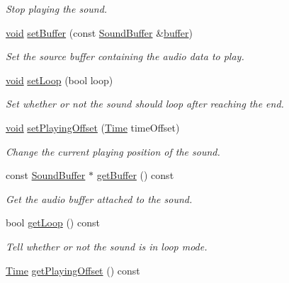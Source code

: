 \begin{DoxyCompactItemize}
\begin{DoxyCompactList}\small\item\em Stop playing the sound. \end{DoxyCompactList}\item 
\hyperlink{glutf90_8h_ac778d6f63f1aaf8ebda0ce6ac821b56e}{void} \hyperlink{classsf_1_1_sound_a8b395e9713d0efa48a18628c8ec1972e}{set\-Buffer} (const \hyperlink{classsf_1_1_sound_buffer}{Sound\-Buffer} \&\hyperlink{gl3_8h_a7fc54503e1a1cf98d128b839ebc0b4d0}{buffer})
\begin{DoxyCompactList}\small\item\em Set the source buffer containing the audio data to play. \end{DoxyCompactList}\item 
\hyperlink{glutf90_8h_ac778d6f63f1aaf8ebda0ce6ac821b56e}{void} \hyperlink{classsf_1_1_sound_af23ab4f78f975bbabac031102321612b}{set\-Loop} (bool loop)
\begin{DoxyCompactList}\small\item\em Set whether or not the sound should loop after reaching the end. \end{DoxyCompactList}\item 
\hyperlink{glutf90_8h_ac778d6f63f1aaf8ebda0ce6ac821b56e}{void} \hyperlink{classsf_1_1_sound_ab905677846558042022dd6ab15cddff0}{set\-Playing\-Offset} (\hyperlink{classsf_1_1_time}{Time} time\-Offset)
\begin{DoxyCompactList}\small\item\em Change the current playing position of the sound. \end{DoxyCompactList}\item 
const \hyperlink{classsf_1_1_sound_buffer}{Sound\-Buffer} $\ast$ \hyperlink{classsf_1_1_sound_a5f2f1ec6603f73625f393f0e9ab64476}{get\-Buffer} () const 
\begin{DoxyCompactList}\small\item\em Get the audio buffer attached to the sound. \end{DoxyCompactList}\item 
bool \hyperlink{classsf_1_1_sound_a603fbd32b519ae1680c40d8ddfc7ea51}{get\-Loop} () const 
\begin{DoxyCompactList}\small\item\em Tell whether or not the sound is in loop mode. \end{DoxyCompactList}\item 
\hyperlink{classsf_1_1_time}{Time} \hyperlink{classsf_1_1_sound_aeca741a3442d9934369a986ad40f19c0}{get\-Playing\-Offset} () const 

\end{DoxyCompactItemize}
